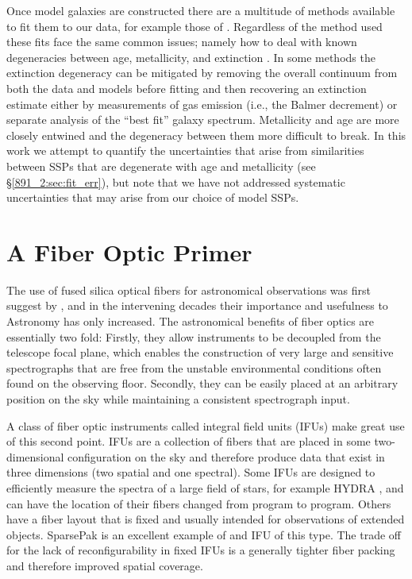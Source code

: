 Once model galaxies are constructed there are a multitude of methods
available to fit them to our data, for example those of
\citep{Cappellari04, Tojeiro07,Chen12, CidFernandes05, Ocvirk06,
  Wilkinson15, Sanchez16}. Regardless of the method used these fits
face the same common issues; namely how to deal with known
degeneracies between age, metallicity, and extinction
\citep{Oconnel76,Aaronson78,Worthey94,dePaz02}. In some methods the
extinction degeneracy can be mitigated by removing the overall
continuum from both the data and models before fitting
\citep[e.g.,][]{Ocvirk06,Wilkinson15} and then recovering an
extinction estimate either by measurements of gas emission (i.e., the
Balmer decrement) or separate analysis of the ``best fit'' galaxy
spectrum. Metallicity and age are more closely entwined and the
degeneracy between them more difficult to break. In this work we
attempt to quantify the uncertainties that arise from similarities
between SSPs that are degenerate with age and metallicity (see
\S\ref{891_2:sec:fit_err}), but note that we have not addressed systematic
uncertainties that may arise from our choice of model SSPs.

\section{A Fiber Optic Primer}
\label{intro:sec:fiber}
The use of fused silica optical fibers for astronomical observations
was first suggest by \citet{Angel77}, and in the intervening decades
their importance and usefulness to Astronomy has only increased. The
astronomical benefits of fiber optics are essentially two fold:
Firstly, they allow instruments to be decoupled from the telescope
focal plane, which enables the construction of very large and
sensitive spectrographs that are free from the unstable environmental
conditions often found on the observing floor. Secondly, they can be
easily placed at an arbitrary position on the sky while maintaining a
consistent spectrograph input.

A class of fiber optic instruments called integral field units (IFUs)
make great use of this second point. IFUs are a collection of fibers
that are placed in some two-dimensional configuration on the sky and
therefore produce data that exist in three dimensions (two spatial and
one spectral). Some IFUs are designed to efficiently measure the
spectra of a large field of stars, for example HYDRA \citep{Barden93},
and can have the location of their fibers changed from program to
program. Others have a fiber layout that is fixed and usually intended
for observations of extended objects. SparsePak
\citep{Bershady04,Bershady05} is an excellent example of and IFU of
this type. The trade off for the lack of reconfigurability in fixed
IFUs is a generally tighter fiber packing and therefore improved
spatial coverage.

